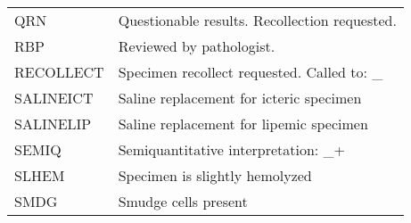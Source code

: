 \begin{fullwidth}
\begin{longtable}{p{.20\linewidth} p{.75\linewidth}}
QRN         & Questionable results. Recollection requested.                                                                                                                                                                                                                                                \\
RBP         & Reviewed by pathologist.                                                                                                                                                                                                                                                                     \\
RECOLLECT   & Specimen recollect requested.  Called to: \_                                                                                                                                                                                                                                                  \\
SALINEICT   & Saline replacement for icteric specimen                                                                                                                                                                                                                                                      \\
SALINELIP   & Saline replacement for lipemic specimen                                                                                                                                                                                                                                                      \\
SEMIQ       & Semiquantitative interpretation: \_+                                                                                                                                                                                                                                                          \\
SLHEM       & Specimen is slightly hemolyzed                                                                                                                                                                                                                                                               \\
SMDG        & Smudge cells present                                                                                                                                                                                                                                                                         \\

\end{longtable}
\end{fullwidth}
